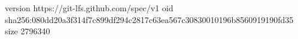 version https://git-lfs.github.com/spec/v1
oid sha256:080dd20a3f314f7c899df294c2817c63ea567c30830010196b8560919190fd35
size 2796340

